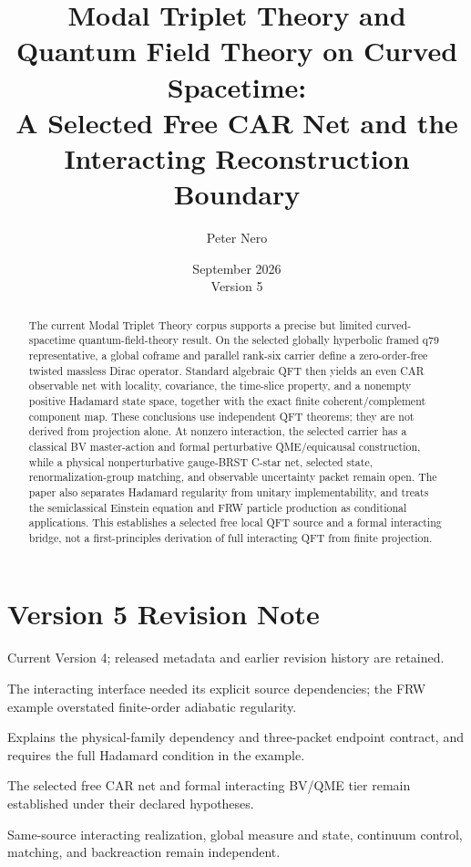 \documentclass[11pt]{article}
\title{Modal Triplet Theory and Quantum Field Theory on Curved Spacetime:\\
\large A Selected Free CAR Net and the Interacting Reconstruction Boundary}
\author{Peter Nero}
\date{September 2026\\Version 5}
\theoremstyle{definition}
\theoremstyle{remark}
\begin{document}
\maketitle

\begin{abstract}
The current Modal Triplet Theory corpus supports a precise but limited
curved-spacetime quantum-field-theory result. On the selected globally
hyperbolic framed q79 representative, a global coframe and parallel
rank-six carrier define a zero-order-free twisted massless Dirac operator.
Standard algebraic QFT then yields an even CAR observable net with locality,
covariance, the time-slice property, and a nonempty positive Hadamard state
space, together with the exact finite coherent/complement component map.
These conclusions use independent QFT theorems; they are not derived from
projection alone. At nonzero interaction, the selected carrier has a
classical BV master-action and formal perturbative QME/equicausal
construction, while a physical nonperturbative gauge-BRST C-star net,
selected state, renormalization-group matching, and observable uncertainty
packet remain open. The paper also separates Hadamard regularity from
unitary implementability, and treats the semiclassical Einstein equation and
FRW particle production as conditional applications. This establishes a
selected free local QFT source and a formal interacting bridge, not a
first-principles derivation of full interacting QFT from finite projection.
\end{abstract}

\section*{Version 5 Revision Note}
\begin{description}[leftmargin=3.2cm,style=nextline]
\item[Supersedes] Current Version 4; released metadata and earlier revision
history are retained.
\item[Reason] The interacting interface needed its explicit source
dependencies; the FRW example overstated finite-order adiabatic regularity.
\item[Resolution] Explains the physical-family dependency and three-packet
endpoint contract, and requires the full Hadamard condition in the example.
\item[Retained] The selected free CAR net and formal interacting BV/QME tier
remain established under their declared hypotheses.
\item[Open boundary] Same-source interacting realization, global measure and
state, continuum control, matching, and backreaction remain independent.
\end{description}
\end{document}
